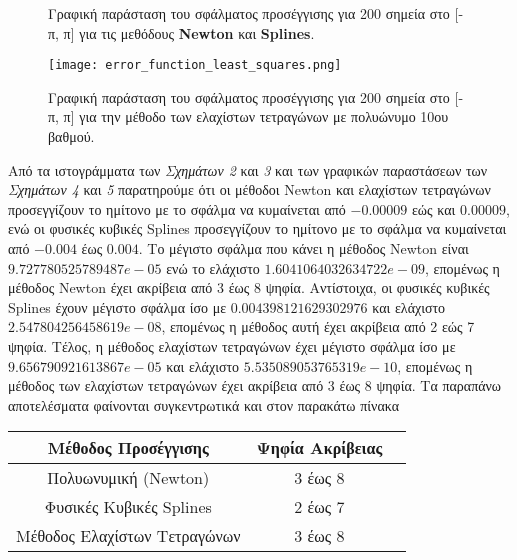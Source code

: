 \documentclass[Second Project.tex]{subfiles}
\begin{document}
\vspace{5mm}
\begin{figure}[h!]
    \centering
    \captionsetup{justification=centering}
    \quad
    \caption{ Γραφική παράσταση του σφάλματος προσέγγισης για 200 σημεία στο [-π, π] για τις 
    μεθόδους \textlatin{\textbf{Newton}} και \textlatin{\textbf{Splines}}.}
\end{figure}
\vspace{5px}
\begin{figure}[h!]
    \centering
    \captionsetup{justification=centering}
    \begin{center}
        \texttt{[image: error\_function\_least\_squares.png]}    
        \caption{ Γραφική παράσταση του σφάλματος προσέγγισης για 200 σημεία στο [-π, π] για την μέθοδο των ελαχίστων τετραγώνων 
        με πολυώνυμο 10ου βαθμού.}
    \end{center}
\end{figure}
Από τα ιστογράμματα των \textit{Σχημάτων 2} και \textit{3} και των γραφικών παραστάσεων των \textit{Σχημάτων 4} και 
\textit{5} παρατηρούμε ότι οι μέθοδοι \textlatin{Newton} 
και ελαχίστων τετραγώνων προσεγγίζουν το ημίτονο με το σφάλμα να κυμαίνεται από $-0.00009$ εώς και $0.00009$, ενώ οι
φυσικές κυβικές \textlatin{Splines} προσεγγίζουν το ημίτονο με το σφάλμα να κυμαίνεται από $-0.004$ έως $0.004$.
Το μέγιστο σφάλμα που κάνει η μέθοδος \textlatin{Newton} είναι $9.727780525789487e-05$ ενώ το ελάχιστο
$1.6041064032634722e-09$, επομένως η μέθοδος \textlatin{Newton} έχει ακρίβεια από 3 έως 8 ψηφία. Αντίστοιχα, οι 
φυσικές κυβικές \textlatin{Splines} έχουν μέγιστο σφάλμα ίσο με $0.004398121629302976$ και ελάχιστο 
$2.547804256458619e-08$, επομένως η μέθοδος αυτή έχει ακρίβεια από 2 εώς 7 ψηφία. Τέλος, η μέθοδος ελαχίστων
τετραγώνων έχει μέγιστο σφάλμα ίσο με $9.656790921613867e-05$ και ελάχιστο $5.535089053765319e-10$, επομένως η
μέθοδος των ελαχίστων τετραγώνων έχει ακρίβεια από 3 έως 8 ψηφία. Τα παραπάνω αποτελέσματα φαίνονται συγκεντρωτικά 
και στον παρακάτω πίνακα 
\begin{center}
    \begin{tabular}{ |c|c|c| } 
     \hline
     Μέθοδος Προσέγγισης & Ψηφία Ακρίβειας \\
     \hline
     Πολυωνυμική (\textlatin{Newton}) & 3 έως 8 \\
     \hline
     Φυσικές Κυβικές \textlatin{Splines} & 2 έως 7 \\ 
     \hline
     Μέθοδος Ελαχίστων Τετραγώνων & 3 έως 8 \\
     \hline
    \end{tabular}
\end{center}
\newpage
\end{document}
